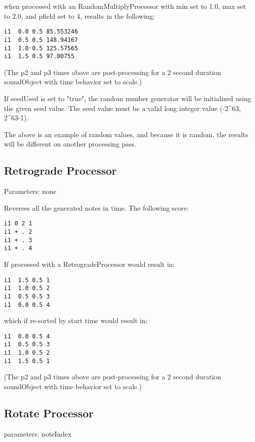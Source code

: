 when processed with an RandomMultiplyProcessor with min set to 1.0, max
set to 2.0, and pfield set to 4, results in the following:

\begin{verbatim}
i1  0.0 0.5 85.553246
i1  0.5 0.5 148.94167
i1  1.0 0.5 125.57565
i1  1.5 0.5 97.00755
\end{verbatim}

(The p2 and p3 times above are post-processing for a 2 second duration
soundObject with time behavior set to scale.)

If seedUsed is set to "true", the random number generator will be
initialized using the given seed value. The seed value must be a valid
long integer value (-2\^{}63, 2\^{}63-1).

The above is an example of random values, and because it is random, the
results will be different on another processing pass.


\subsection{Retrograde Processor}\label{retrogradeProcessor}

Parameters: none

Reverses all the generated notes in time. The following score:

\begin{verbatim}
i1 0 2 1
i1 + . 2
i1 + . 3
i1 + . 4
\end{verbatim}

If processed with a RetrogradeProcessor would result in:

\begin{verbatim}
i1  1.5 0.5 1
i1  1.0 0.5 2
i1  0.5 0.5 3
i1  0.0 0.5 4
\end{verbatim}

which if re-sorted by start time would result in:

\begin{verbatim}
i1  0.0 0.5 4
i1  0.5 0.5 3
i1  1.0 0.5 2
i1  1.5 0.5 1
\end{verbatim}

(The p2 and p3 times above are post-processing for a 2 second duration
soundObject with time behavior set to scale.)


\subsection{Rotate Processor}\label{rotateProcessor}

parameters: noteIndex

